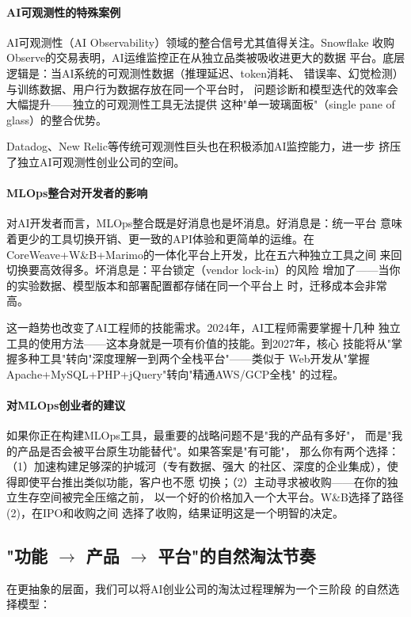 \paragraph{AI可观测性的特殊案例}
AI可观测性（AI Observability）领域的整合信号尤其值得关注。Snowflake
收购Observe的交易表明，AI运维监控正在从独立品类被吸收进更大的数据
平台。底层逻辑是：当AI系统的可观测性数据（推理延迟、token消耗、
错误率、幻觉检测）与训练数据、用户行为数据存放在同一个平台时，
问题诊断和模型迭代的效率会大幅提升——独立的可观测性工具无法提供
这种"单一玻璃面板"（single pane of glass）的整合优势。

Datadog、New Relic等传统可观测性巨头也在积极添加AI监控能力，进一步
挤压了独立AI可观测性创业公司的空间。

\paragraph{MLOps整合对开发者的影响}
对AI开发者而言，MLOps整合既是好消息也是坏消息。好消息是：统一平台
意味着更少的工具切换开销、更一致的API体验和更简单的运维。在
CoreWeave+W\&B+Marimo的一体化平台上开发，比在五六种独立工具之间
来回切换要高效得多。坏消息是：平台锁定（vendor lock-in）的风险
增加了——当你的实验数据、模型版本和部署配置都存储在同一个平台上
时，迁移成本会非常高。

这一趋势也改变了AI工程师的技能需求。2024年，AI工程师需要掌握十几种
独立工具的使用方法——这本身就是一项有价值的技能。到2027年，核心
技能将从"掌握多种工具"转向"深度理解一到两个全栈平台"——类似于
Web开发从"掌握Apache+MySQL+PHP+jQuery"转向"精通AWS/GCP全栈"
的过程。

\paragraph{对MLOps创业者的建议}
如果你正在构建MLOps工具，最重要的战略问题不是"我的产品有多好"，
而是"我的产品是否会被平台原生功能替代"。如果答案是"有可能"，
那么你有两个选择：（1）加速构建足够深的护城河（专有数据、强大
的社区、深度的企业集成），使得即使平台推出类似功能，客户也不愿
切换；（2）主动寻求被收购——在你的独立生存空间被完全压缩之前，
以一个好的价格加入一个大平台。W\&B选择了路径(2)，在IPO和收购之间
选择了收购，结果证明这是一个明智的决定。


\subsection{"功能 $\to$ 产品 $\to$ 平台"的自然淘汰节奏}
\label{subsec:outlook-feature-product-platform}

在更抽象的层面，我们可以将AI创业公司的淘汰过程理解为一个三阶段
的自然选择模型：

